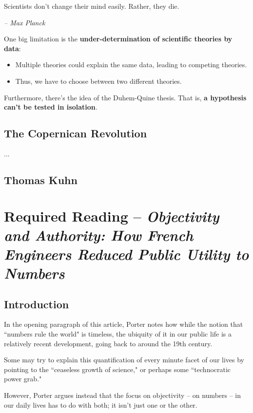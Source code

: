 \documentclass[openany]{book}
\begin{document}
\begin{fancyquotes}
	Scientists don't change their mind easily. Rather, they die.
	
	\begin{flushright}
		\emph{\textit{-- Max Planck}}
	\end{flushright}
\end{fancyquotes}

One big limitation is the \textbf{under-determination of scientific theories by data}:
\begin{itemize}
	\item Multiple theories could explain the same data, leading to competing theories.
	\item Thus, we have to choose between two different theories.
\end{itemize}

Furthermore, there's the idea of the Duhem-Quine thesis. That is, \textbf{a hypothesis can't be tested in isolation}.

\subsection{The Copernican Revolution}
...

\subsection{Thomas Kuhn}

\section{Required Reading -- \textit{Objectivity and Authority: How French Engineers Reduced Public Utility to Numbers}}

\subsection{Introduction}
In the opening paragraph of this article, Porter notes how while the notion that ``numbers rule the world" is timeless, the ubiquity of it in our public life is a relatively recent development, going back to around the 19th century.

Some may try to explain this quantification of every minute facet of our lives by pointing to the ``ceaseless growth of science," or perhaps some ``technocratic power grab."

However, Porter argues instead that the focus on objectivity -- on numbers -- in our daily lives has to do with both; it isn't just one or the other.
\end{document}
